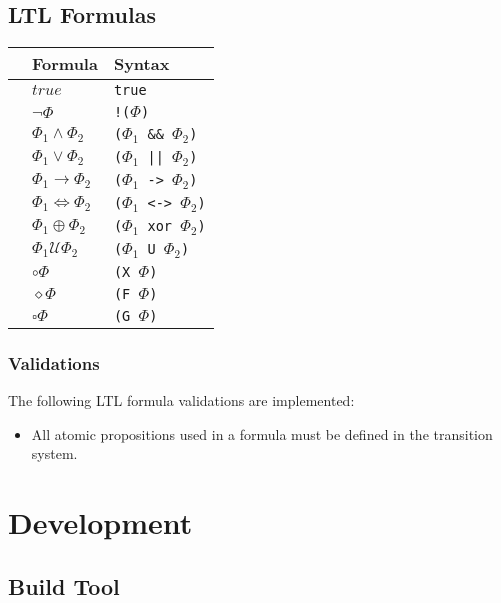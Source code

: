 \documentclass[11pt]{article}
\begin{document}
\subsection{LTL Formulas}

\begin{tabular}{l|ll}
  & Formula & Syntax \\
  \hline
  & $true$ & \verb|true| \\
  & $\neg\Phi$ & \verb|!(|$\Phi$\verb|)| \\
  & $\Phi_1 \wedge \Phi_2$ & \verb|(|$\Phi_1$\verb| && |$\Phi_2$\verb|)| \\
  & $\Phi_1 \vee \Phi_2$ & \verb|(|$\Phi_1$\verb[ || [$\Phi_2$\verb|)| \\
  & $\Phi_1 \rightarrow \Phi_2$ & \verb|(|$\Phi_1$\verb| -> |$\Phi_2$\verb|)| \\
  & $\Phi_1 \iff \Phi_2$ & \verb|(|$\Phi_1$\verb| <-> |$\Phi_2$\verb|)| \\
  & $\Phi_1 \oplus \Phi_2$ & \verb|(|$\Phi_1$\verb| xor |$\Phi_2$\verb|)| \\
  & $\Phi_1 \mathcal{U} \Phi_2$ & \verb|(|$\Phi_1$\verb| U |$\Phi_2$\verb|)| \\
  & $\circ \Phi$ & \verb|(X |$\Phi$\verb|)| \\
  & $\diamond \Phi$ & \verb|(F |$\Phi$\verb|)| \\
  & $\square \Phi$ & \verb|(G |$\Phi$\verb|)| \\
\end{tabular}

\subsubsection{Validations}

The following LTL formula validations are implemented:

\begin{itemize}
  \item All atomic propositions used in a formula must be defined in the transition system.
\end{itemize}


\section{Development}

\subsection{Build Tool}
\end{document}
